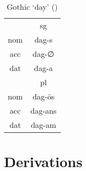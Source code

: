 \begin{table}[H]
	\center
	\caption {Gothic  `day' ()}
		\begin{tabular}{cc}
		\toprule
							& \ac{sg}       \\
		 						\cmidrule{2-2}
    \ac{nom} 	& dag-s   	 		\\
    \ac{acc}	& dag-∅   	    \\
    \ac{dat} 	& dag-a  	  		\\
		\bottomrule
    					& \ac{pl}	      \\
						    \cmidrule{2-2}
    \ac{nom} 	& dag-ōs  			\\
    \ac{acc} 	& dag-ans   		\\
    \ac{dat} 	& dag-am     		\\
    \bottomrule
		\end{tabular}
\end{table}




\section{Derivations}
